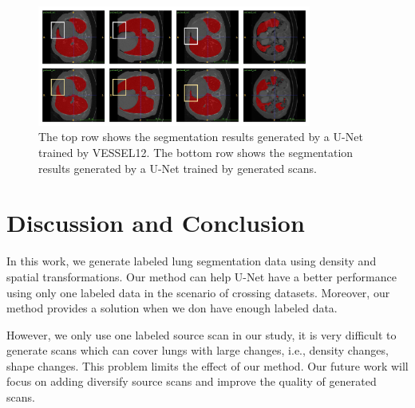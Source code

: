 \documentclass{article}
\begin{document}
\begin{figure}[t]
    \centerline{\includegraphics[width=90mm]{lungs.pdf}}
    \vspace{-0cm}
    \caption{The top row shows the segmentation results generated by a U-Net trained by VESSEL12. The bottom row shows the segmentation results generated by a U-Net trained by generated scans. 
    }
    \vspace{-0cm}
    \label{lungs}
    \end{figure}



\section{Discussion and Conclusion}
\label{sec:discussconclusion}
In this work, we generate labeled lung segmentation data using density and spatial transformations. Our method can help U-Net have a better performance using only one labeled data in the scenario of crossing datasets. Moreover, our method provides a solution when we don have enough labeled data.

However, we only use one labeled source scan in our study, it is very difficult to generate scans which can cover lungs with large changes, i.e., density changes, shape changes. This problem limits the effect of our method. Our future work will focus on adding diversify source scans and improve the quality of generated scans.



\end{document}
